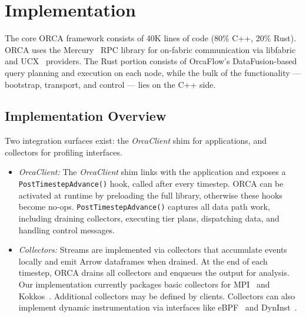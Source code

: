 
\section{Implementation}
\label{sec:orca:impl}

\newcommand{\orcaclient}{\emph{OrcaClient}}
\newcommand{\ocinit}{\texttt{Init()}}
\newcommand{\ocdest}{\texttt{Destroy()}}
\newcommand{\ocpta}{\texttt{PostTimestepAdvance()}}
\newcommand{\ocadd}{\texttt{AddRow}}

\newcommand{\topodir}{\texttt{DIRECT}}
\newcommand{\toporep}{\texttt{MPIREP}}

The core ORCA framework consists of 40K lines of code (80\% C++, 20\% Rust).
ORCA uses the Mercury~\cite{Souma2013:MercuryRPC} RPC library for on-fabric communication via
libfabric~\cite{Grun2015:libfabrica} and UCX~\cite{Shami2015:UCX} providers.
The Rust portion consists of OrcaFlow's DataFusion-based query planning and execution on each node,
while the bulk of the functionality --- bootstrap, transport, and control --- lies on the C++ side.

\subsection{Implementation Overview}

Two integration surfaces exist: the \orcaclient{} shim for applications, and collectors for
profiling interfaces.

\begin{itemize}[leftmargin=*]
  \item \emph{OrcaClient:}
        The \orcaclient{} shim links with the application and exposes a \ocpta{} hook, called after every
        timestep.
        ORCA can be activated at runtime by preloading the full library, otherwise these hooks become
        no-ops.
        \ocpta{}  captures all data path work, including draining collectors, executing
        tier plans, dispatching data, and handling control messages.

  \item \emph{Collectors:}
        Streams are implemented via collectors that accumulate events locally and emit Arrow dataframes
        when drained.
        At the end of each timestep, ORCA drains all collectors and enqueues the output for analysis.
        Our implementation currently packages basic collectors for MPI~\cite{:MPI} and
        Kokkos~\cite{Trott2022:Kokkos3}.
        Additional collectors may be defined by clients.
        Collectors can also implement dynamic instrumentation via interfaces like eBPF~\cite{:eBPF} and
        DynInst~\cite{Berna2011:DynInst}.

\end{itemize}


